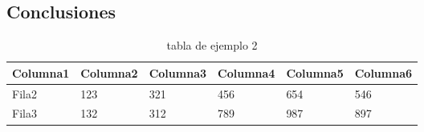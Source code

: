 \documentclass[10pt, a4paper]{article}
\begin{document}
\begin{multicols}{2}  %

\section{Conclusiones}
\lipsum[8-9] \cite{lorem2025}
\end{multicols}
\begin{table}[h]
  \centering
  
  \label{tab:mitabla}
    \begin{tabular}{|l|l|l|l|l|l|}
    \hline
    \textbf{Columna1} & \textbf{Columna2} & \textbf{Columna3} & \textbf{Columna4} & \textbf{Columna5} & \textbf{Columna6} \\ \hline
    Fila2             & 123               & 321               & 456               & 654               & 546               \\ \hline
    Fila3             & 132               & 312               & 789               & 987               & 897               \\ \hline
    \end{tabular}
  \caption{tabla de ejemplo 2}
\end{table}

\begin{multicols}{2}
\lipsum[10-12]


\end{multicols}



\end{document}
